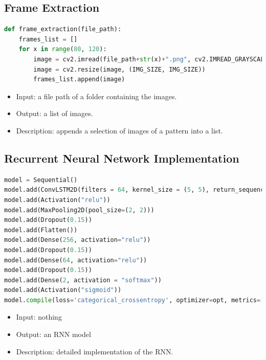 \documentclass[12pt]{article}
\numberwithin{figure}{section} %
\begin{document}
\newpage
\subsection{Frame Extraction}
\label{subsection:Frame Extraction}
\begin{lstlisting}[language = Python]
def frame_extraction(file_path):
    frames_list = []
    for x in range(80, 120):
        image = cv2.imread(file_path+str(x)+".png", cv2.IMREAD_GRAYSCALE)
        image = cv2.resize(image, (IMG_SIZE, IMG_SIZE))
        frames_list.append(image)
\end{lstlisting}
\vspace{-1.5em}
\begin{itemize}[leftmargin = 0.5cm, topsep=0pt,itemsep=-1ex,partopsep=1ex,parsep=1ex]
\item Input: a file path of a folder containing the images.  
\item Output: a list of images.   
\item Description: appends a selection of images of a pattern into a list. 
\end{itemize}

\subsection{Recurrent Neural Network Implementation}
\label{subsection:Recurrent Neural Network Implementation}
\begin{lstlisting}[language = Python]
model = Sequential()
model.add(ConvLSTM2D(filters = 64, kernel_size = (5, 5), return_sequences = False, data_format = "channels_last", input_shape = X.shape[1:]))
model.add(Activation("relu"))
model.add(MaxPooling2D(pool_size=(2, 2)))
model.add(Dropout(0.15))
model.add(Flatten())
model.add(Dense(256, activation="relu"))
model.add(Dropout(0.15))
model.add(Dense(64, activation="relu"))
model.add(Dropout(0.15))
model.add(Dense(2, activation = "softmax"))
model.add(Activation("sigmoid"))
model.compile(loss='categorical_crossentropy', optimizer=opt, metrics=["accuracy"])
\end{lstlisting}
\vspace{-1.5em}
\begin{itemize}[leftmargin = 0.5cm, topsep=0pt,itemsep=-1ex,partopsep=1ex,parsep=1ex]
\item Input: nothing 
\item Output: an RNN model 
\item Description: detailed implementation of the RNN. 
\end{itemize}
\end{document}
